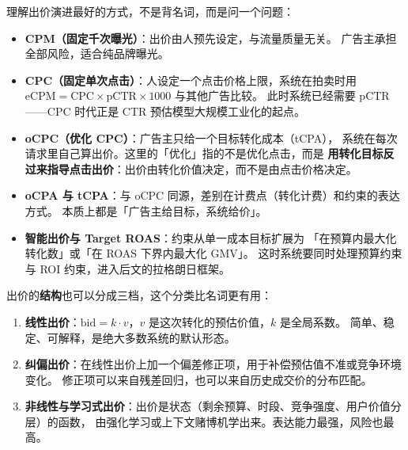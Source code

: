 理解出价演进最好的方式，不是背名词，而是问一个问题：

\begin{itemize}
  \item \textbf{CPM（固定千次曝光）}：出价由人预先设定，与流量质量无关。
        广告主承担全部风险，适合纯品牌曝光。
  \item \textbf{CPC（固定单次点击）}：人设定一个点击价格上限，系统在拍卖时用
        $\mathrm{eCPM} = \text{CPC} \times \mathrm{pCTR} \times 1000$ 与其他广告比较。
        此时系统已经需要 pCTR——CPC 时代正是 CTR 预估模型大规模工业化的起点。
  \item \textbf{oCPC（优化 CPC）}：广告主只给一个目标转化成本（tCPA），
        系统在每次请求里自己算出价。这里的「优化」指的不是优化点击，而是
        \textbf{用转化目标反过来指导点击出价}：出价由转化价值决定，而不是由点击价格决定。
  \item \textbf{oCPA 与 tCPA}：与 oCPC 同源，差别在计费点（转化计费）和约束的表达方式。
        本质上都是「广告主给目标，系统给价」。
  \item \textbf{智能出价与 Target ROAS}：约束从单一成本目标扩展为
        「在预算内最大化转化数」或「在 ROAS 下界内最大化 GMV」。
        这时系统要同时处理预算约束与 ROI 约束，进入后文的拉格朗日框架。
\end{itemize}

出价的\textbf{结构}也可以分成三档，这个分类比名词更有用：

\begin{enumerate}
  \item \textbf{线性出价}：$\text{bid} = k \cdot v$，$v$ 是这次转化的预估价值，$k$ 是全局系数。
        简单、稳定、可解释，是绝大多数系统的默认形态。
  \item \textbf{纠偏出价}：在线性出价上加一个偏差修正项，用于补偿预估值不准或竞争环境变化。
        修正项可以来自残差回归，也可以来自历史成交价的分布匹配。
  \item \textbf{非线性与学习式出价}：出价是状态（剩余预算、时段、竞争强度、用户价值分层）的函数，
        由强化学习或上下文赌博机学出来。表达能力最强，风险也最高。
\end{enumerate}

